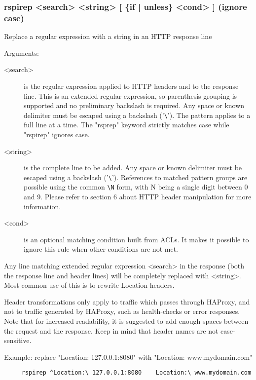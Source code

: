\subsubsection[rspirep]{rspirep <search> <string> [ \{if | unless\} <cond> ]  (ignore case)}


  Replace a regular expression with a string in an HTTP response line


  Arguments:
  \begin{description}
  \item[<search>] is the regular expression applied to HTTP headers and to the
              response line. This is an extended regular expression, so
              parenthesis grouping is supported and no preliminary backslash
              is required. Any space or known delimiter must be escaped using
              a backslash ('\verb|\|'). The pattern applies to a full line at a time.
              The "rsprep" keyword strictly matches case while "rspirep"
              ignores case.

  \item[<string>] is the complete line to be added. Any space or known delimiter
              must be escaped using a backslash ('\verb|\|'). References to matched
              pattern groups are possible using the common \verb|\N| form, with N
              being a single digit between 0 and 9. Please refer to section
              6 about HTTP header manipulation for more information.

  \item[<cond>] is an optional matching condition built from ACLs. It makes it
              possible to ignore this rule when other conditions are not met.
  \end{description}

  Any line matching extended regular expression <search> in the response (both
  the response line and header lines) will be completely replaced with
  <string>. Most common use of this is to rewrite Location headers.

  Header transformations only apply to traffic which passes through HAProxy,
  and not to traffic generated by HAProxy, such as health-checks or error
  responses. Note that for increased readability, it is suggested to add enough
  spaces between the request and the response. Keep in mind that header names
  are not case-sensitive.

  Example: replace "Location: 127.0.0.1:8080" with "Location: www.mydomain.com"
  \begin{verbatim}
     rspirep ^Location:\ 127.0.0.1:8080    Location:\ www.mydomain.com
  \end{verbatim}

